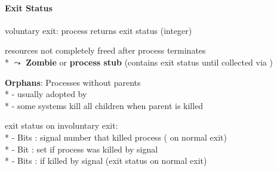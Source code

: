 \paragraph{Exit Status}
\begin{items}
  \item voluntary exit: process returns exit status (integer)
  \item resources not completely freed after process terminates \\*
    \( \leadsto \) \textbf{Zombie} or \textbf{process stub} (contains exit status until collected via )
  \item \textbf{Orphans}: Processes without parents \\*
    - usually adopted by  \\*
    - some systems kill all children when parent is killed
  \item exit status on involuntary exit: \\*
    - Bits : signal number that killed process ( on normal exit) \\*
    - Bit : set if process was killed by signal \\*
    - Bits :  if killed by signal (exit status on normal exit)
\end{items}
